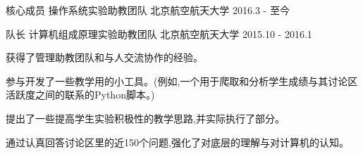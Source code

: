 


\begin{cventries}


\cventry
{核心成员} %
{操作系统实验助教团队} %
{北京航空航天大学} %
{2016.3 - 至今} %
{ %
}



\cventry
{队长} %
{计算机组成原理实验助教团队} %
{北京航空航天大学} %
{2015.10 - 2016.1} %
{ %
\begin{cvitems}
\item {获得了管理助教团队和与人交流协作的经验。}
\item {参与开发了一些教学用的小工具。(例如,一个用于爬取和分析学生成绩与其讨论区活跃度之间的联系的Python脚本。)}
\item {提出了一些提高学生实验积极性的教学思路,并实际执行了部分。}
\item {通过认真回答讨论区里的近150个问题,强化了对底层的理解与对计算机的认知。}
\end{cvitems}
}


%

\end{cventries}